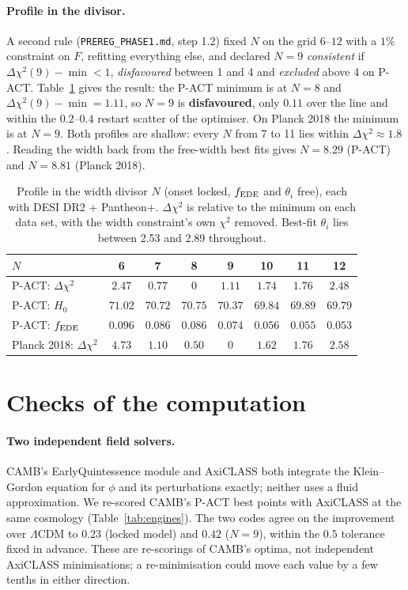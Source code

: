 \documentclass[11pt]{article}
\begin{document}
\paragraph{Profile in the divisor.} A second rule (\texttt{PREREG\_PHASE1.md}, step 1.2) fixed $N$ on the
grid $6$--$12$ with a $1\%$ constraint on $F$, refitting everything else, and declared $N=9$
\emph{consistent} if $\Delta\chi^2(9)-\min<1$, \emph{disfavoured} between 1 and 4 and \emph{excluded}
above 4 on P-ACT. Table~\ref{tab:profile} gives the result: the P-ACT minimum is at $N=8$ and
$\Delta\chi^2(9)-\min=1.11$, so $N=9$ is \textbf{disfavoured}, only $0.11$ over the line and within the
$0.2$--$0.4$ restart scatter of the optimiser. On Planck 2018 the minimum is at $N=9$. Both profiles are
shallow: every $N$ from 7 to 11 lies within $\Delta\chi^2\approx1.8$. Reading the width back from the
free-width best fits gives $N=8.29$ (P-ACT) and $N=8.81$ (Planck 2018).

\begin{table}[h]
\centering
\small
\begin{tabular}{lccccccc}
\toprule
$N$ & 6 & 7 & 8 & 9 & 10 & 11 & 12\\
\midrule
P-ACT: $\Delta\chi^2$ & $2.47$ & $0.77$ & $0$ & $1.11$ & $1.74$ & $1.76$ & $2.48$\\
P-ACT: $H_0$ & $71.02$ & $70.72$ & $70.75$ & $70.37$ & $69.84$ & $69.89$ & $69.79$\\
P-ACT: $f_{\rm EDE}$ & $0.096$ & $0.086$ & $0.086$ & $0.074$ & $0.056$ & $0.055$ & $0.053$\\
Planck 2018: $\Delta\chi^2$ & $4.73$ & $1.10$ & $0.50$ & $0$ & $1.62$ & $1.76$ & $2.58$\\
\bottomrule
\end{tabular}
\caption{Profile in the width divisor $N$ (onset locked, $f_{\rm EDE}$ and $\theta_i$ free), each with
DESI DR2 + Pantheon+. $\Delta\chi^2$ is relative to the minimum on each data set, with the width
constraint's own $\chi^2$ removed. Best-fit $\theta_i$ lies between 2.53 and 2.89 throughout.}
\label{tab:profile}
\end{table}

\section{Checks of the computation}\label{sec:checks}

\paragraph{Two independent field solvers.} CAMB's EarlyQuintessence module and AxiCLASS both integrate
the Klein--Gordon equation for $\phi$ and its perturbations exactly; neither uses a fluid
approximation. We re-scored CAMB's P-ACT best points with AxiCLASS at the same cosmology
(Table~\ref{tab:engines}). The two codes agree on the improvement over $\Lambda$CDM to $0.23$ (locked
model) and $0.42$ ($N=9$), within the $0.5$ tolerance fixed in advance. These are re-scorings of CAMB's
optima, not independent AxiCLASS minimisations; a re-minimisation could move each value by a few
tenths in either direction.
\end{document}
